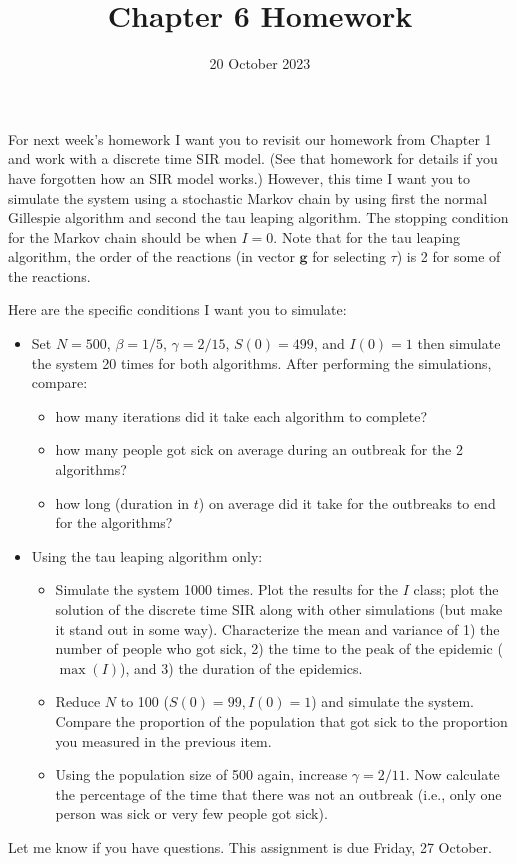\documentclass{article}
\title{Chapter 6 Homework}
\date{20 October 2023}
\begin{document}
\maketitle

For next week's homework I want you to revisit our homework from Chapter 1 and work with a discrete time SIR model. (See that homework for details if you have forgotten how an SIR model works.) However, this time I want you to simulate the system using a stochastic Markov chain by using first the normal Gillespie algorithm and second the tau leaping algorithm. The stopping condition for the Markov chain should be when $I = 0$. Note that for the tau leaping algorithm, the order of the reactions (in vector $\mathbf{g}$ for selecting $\tau$) is 2 for some of the reactions.

Here are the specific conditions I want you to simulate:

\begin{itemize}
\item Set $N = 500$, $\beta = 1/5$, $\gamma = 2/15$, $S(0) = 499$, and $I(0) = 1$ then simulate the system 20 times for both algorithms. After performing the simulations, compare:
\begin{itemize}
\item how many iterations did it take each algorithm to complete?
\item how many people got sick on average during an outbreak for the 2 algorithms?
\item how long (duration in $t$) on average did it take for the outbreaks to end for the algorithms?
\end{itemize}
\item Using the tau leaping algorithm only:
\begin{itemize}
\item Simulate the system 1000 times. Plot the results for the $I$ class; plot the solution of the discrete time SIR along with other simulations (but make it stand out in some way). Characterize the mean and variance of 1) the number of people who got sick, 2) the time to the peak of the epidemic ($\max(I)$), and 3) the duration of the epidemics. 
\item Reduce $N$ to 100 ($S(0) = 99, I(0) = 1$) and simulate the system. Compare the proportion of the population that got sick to the proportion you measured in the previous item. 
\item Using the population size of 500 again, increase $\gamma = 2/11$. Now calculate the percentage of the time that there was not an outbreak (i.e., only one person was sick or very few people got sick).
\end{itemize}
\end{itemize}

Let me know if you have questions. This assignment is due Friday, 27 October.
\end{document}
